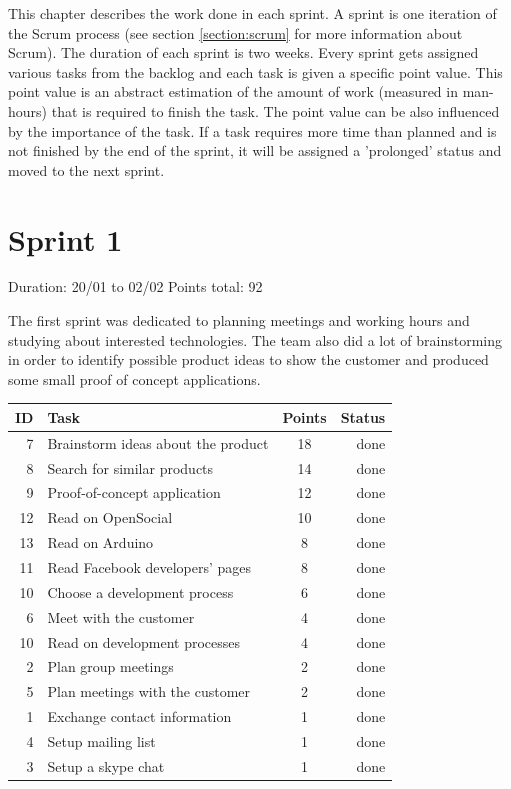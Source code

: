
This chapter describes the work done in each sprint. A sprint is one iteration of the Scrum process
(see section \ref{section:scrum} for more information about Scrum). The duration of each sprint is two weeks.
Every sprint gets assigned various tasks from the backlog and each task is given a specific point value.
This point value is an abstract estimation of the amount of work (measured in man-hours) that is required to finish the task.
The point value can be also influenced by the importance of the task. If a task requires more time than
planned and is not finished by the end of the sprint, it will be assigned a 'prolonged' status and
moved to the next sprint.

\newpage

\section{Sprint 1}

Duration: 20/01 to 02/02
Points total: 92

The first sprint was dedicated to planning meetings and working hours
and studying about interested technologies. The team also did a lot of
brainstorming in order to identify possible product ideas to show the
customer and produced some small proof of concept applications.

\begin{table}[ht!]
\begin{tabular}{ | r | l | c | r | }

\hline
\textbf{ID} & \textbf{Task} & \textbf{Points} & \textbf{Status} \\
\hline

7 & Brainstorm ideas about the product  & 18 & done \\
\hline
8 & Search for similar products     & 14 & done \\
\hline
9 & Proof-of-concept application        & 12 & done \\
\hline
12 & Read on OpenSocial          & 10 & done \\
\hline
13 & Read on Arduino             & 8  & done \\
\hline
11 & Read Facebook developers' pages     & 8  & done \\
\hline
10 & Choose a development process        & 6  & done \\
\hline
6 & Meet with the customer          & 4  & done \\
\hline
10 & Read on development processes       & 4  & done \\
\hline
2 & Plan group meetings			& 2  & done \\
\hline
5 & Plan meetings with the customer		& 2  & done \\
\hline
1 & Exchange contact information        & 1  & done \\
\hline
4 & Setup mailing list			& 1  & done \\
\hline
3 & Setup a skype chat			& 1  & done \\
\hline

\end{tabular}
\end{table}

